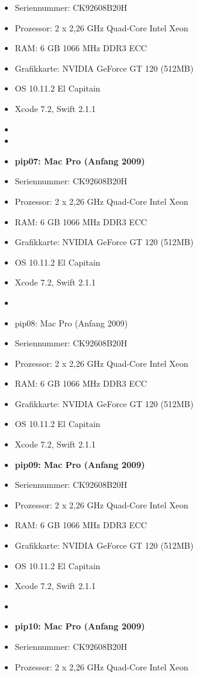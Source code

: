 \begin{itemize}
	\item[] Seriennummer: CK92608B20H
	\item[]Prozessor: 2 x 2,26 GHz Quad-Core Intel Xeon 
	\item[]RAM: 6 GB 1066 MHz DDR3 ECC
	\item[]Grafikkarte: 	NVIDIA GeForce GT 120 (512MB)
	\item[] OS 10.11.2 El Capitain
	\item[] Xcode 7.2, Swift 2.1.1
	\item[]
	\item[] 
	\item\textbf{pip07: Mac Pro (Anfang 2009)}
	\item[] Seriennummer: CK92608B20H
	\item[]Prozessor: 2 x 2,26 GHz Quad-Core Intel Xeon 
	\item[]RAM: 6 GB 1066 MHz DDR3 ECC
	\item[]Grafikkarte: 	NVIDIA GeForce GT 120 (512MB)
	\item[] OS 10.11.2 El Capitain
	\item[] Xcode 7.2, Swift 2.1.1
	\item[] 
	\item pip08: Mac Pro (Anfang 2009)
	\item[] Seriennummer: CK92608B20H
	\item[] Prozessor: 2 x 2,26 GHz Quad-Core Intel Xeon 
	\item[] RAM: 6 GB 1066 MHz DDR3 ECC
	\item[] Grafikkarte: NVIDIA GeForce GT 120 (512MB)
	\item[] OS 10.11.2 El Capitain
	\item[] Xcode 7.2, Swift 2.1.1
	\item\textbf{pip09: Mac Pro (Anfang 2009)}
	\item[] Seriennummer: CK92608B20H
	\item[] Prozessor: 2 x 2,26 GHz Quad-Core Intel Xeon 
	\item[] RAM: 6 GB 1066 MHz DDR3 ECC
	\item[] Grafikkarte: NVIDIA GeForce GT 120 (512MB)
	\item[] OS 10.11.2 El Capitain
	\item[] Xcode 7.2, Swift 2.1.1
	\item[] 
	\item\textbf{pip10: Mac Pro (Anfang 2009)}
	\item[] Seriennummer: CK92608B20H
	\item[] Prozessor: 2 x 2,26 GHz Quad-Core Intel Xeon 

\end{itemize}
